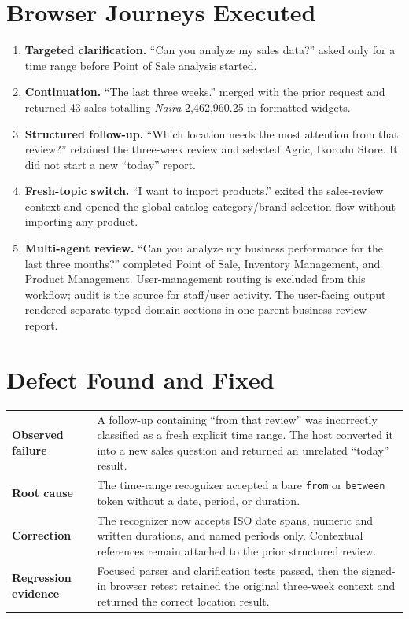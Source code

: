 \documentclass[10pt]{article}
\begin{document}
\section{Browser Journeys Executed}
\begin{enumerate}[leftmargin=18pt,itemsep=5pt]
\item \textbf{Targeted clarification.} ``Can you analyze my sales data?'' asked only for a time range before Point of Sale analysis started.
\item \textbf{Continuation.} ``The last three weeks.'' merged with the prior request and returned 43 sales totalling \textit{Naira} 2,462,960.25 in formatted widgets.
\item \textbf{Structured follow-up.} ``Which location needs the most attention from that review?'' retained the three-week review and selected Agric, Ikorodu Store. It did not start a new ``today'' report.
\item \textbf{Fresh-topic switch.} ``I want to import products.'' exited the sales-review context and opened the global-catalog category/brand selection flow without importing any product.
\item \textbf{Multi-agent review.} ``Can you analyze my business performance for the last three months?'' completed Point of Sale, Inventory Management, and Product Management. User-management routing is excluded from this workflow; audit is the source for staff/user activity. The user-facing output rendered separate typed domain sections in one parent business-review report.
\end{enumerate}

\section{Defect Found and Fixed}
\begin{tabularx}{\textwidth}{>{\bfseries\color{navy}}p{} X}
Observed failure & A follow-up containing ``from that review'' was incorrectly classified as a fresh explicit time range. The host converted it into a new sales question and returned an unrelated ``today'' result. \\
Root cause & The time-range recognizer accepted a bare \texttt{from} or \texttt{between} token without a date, period, or duration. \\
Correction & The recognizer now accepts ISO date spans, numeric and written durations, and named periods only. Contextual references remain attached to the prior structured review. \\
Regression evidence & Focused parser and clarification tests passed, then the signed-in browser retest retained the original three-week context and returned the correct location result. \\
\end{tabularx}
\end{document}
